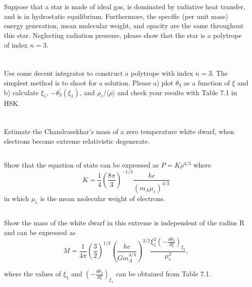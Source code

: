 \section{}
Suppose that a star is made of ideal gas, is dominated by radiative heat transfer, and is in hydrostatic equilibrium. Furthermore, the specific (per unit mass) energy generation, mean molecular weight, and opacity are the same throughout this star.
Neglecting radiation pressure, please show that the star is a polytrope of index $n = 3$.

\section{}
Use some decent integrator to construct a polytrope with index $n = 3$.
The simplest method is to shoot for a solution. 
Please a) plot $\theta_3$ as a function of $\xi$ and b) calculate $\xi_1$, $-\theta_3^\prime(\xi_1)$, and $\rho_c/\langle\rho\rangle$ and check your results with Table 7.1 in HSK.

\section{}
Estimate the Chandrasekhar's mass of a zero temperature white dwarf, when electrons become extreme relativistic degenerate.
\subsection{}
Show that the equation of state can be expressed as $P=K\rho^{4/3}$ where
\begin{equation}
    K = \frac{1}{4}\left(\frac{8\pi}{3}\right)^{-1/3}\frac{hc}{(m_A\mu_e)^{4/3}}
\end{equation}
in which $\mu_e$ is the mean molecular weight of electrons.

\subsection{}
Show the mass of the white dwarf in this extreme is independent of the radius
R and can be expressed as
\begin{equation}
    M = \frac{1}{4\pi}\left(\frac{3}{2}\right)^{1/2}\left(\frac{hc}{Gm_A^{4/3}}\right)^{3/2}\frac{\xi_1^2\left(-\frac{d\theta_3}{d\xi}\right)_{\xi_1}}{\mu_e^2},
\end{equation}

where the values of $\xi_1$ and $\left(-\frac{d\theta_3}{d\xi}\right)_{\xi_1}$ can be obtained from Table 7.1.

